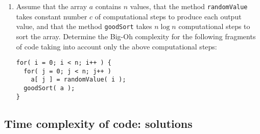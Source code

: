\documentclass[]{article}
\begin{document}
\begin{enumerate}
{\it Hints}: derive and solve the basic recurrence
relating \(T(n)\) in average to \(T(n-1)\),
\ldots, \(T(0)\). 
You might need the equation $\frac{1}{1\cdot 2} + \frac{1}{2\cdot 3} +
\cdots + \frac{1}{n(n+1)} = \frac{n}{n+1}$ for deriving the
explicit formula for \(T(n)\). 
   
\item Assume that the array $a$ contains $n$ values, that 
the method {\tt randomValue} takes constant number $c$ 
of computational steps to
produce each output value, and that the method 
{\tt goodSort} takes $ n \log n$ computational steps
to sort the array.
Determine the Big-Oh complexity for the following
fragments of code taking into account only the
above computational steps:
\begin{verbatim}
for( i = 0; i < n; i++ ) {
  for( j = 0; j < n; j++ )
    a[ j ] = randomValue( i );
  goodSort( a );
}
\end{verbatim} 

\end{enumerate}

\subsection{Time complexity of code: solutions}
\end{document}
